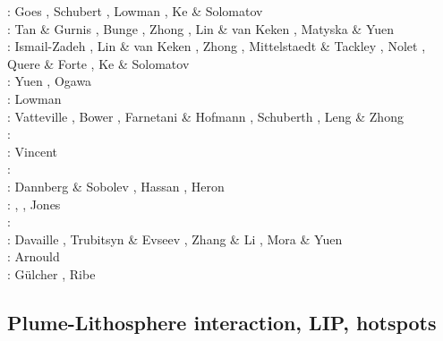 \begin{scriptsize}
\twothousandfour: Goes \etal \cite{goch04}, Schubert \etal \cite{scmo04}, Lowman \etal \cite{lokg04},
                  Ke \& Solomatov \cite{keso04} \\
\twothousandfive: Tan \& Gurnis \cite{tagu05}, Bunge \cite{bung05}, Zhong \cite{zhon05}, 
                  Lin \& van Keken \cite{liva05}, Matyska \& Yuen \cite{mayu05}\\
\twothousandsix: Ismail-Zadeh \etal \cite{isst06}, Lin \& van Keken \cite{liva06a,liva06b}, 
                 Zhong \cite{zhon06}, Mittelstaedt \& Tackley \cite{mita06},
                 Nolet \etal \cite{nokm06}, Quere \& Forte \cite{qufo06}, Ke \& Solomatov \cite{keso06}\\
\twothousandseven: Yuen \etal \cite{yumh07}, Ogawa \cite{ogaw07}\\
\twothousandeight: Lowman \etal \cite{logg08} \\
\twothousandnine: Vatteville \etal \cite{vavl09}, Bower \etal \cite{bogj09},
                  Farnetani \& Hofmann \cite{faho09}, Schuberth \etal \cite{scbs09b},
                  Leng \& Zhong \cite{lezh09}\\
\twothousandeleven: \cite{toyu11}\cite{talz11}\cite{burk11}\cite{memm11}\cite{dalt11}\cite{tree11}\\
\twothousandtwelve: Vincent \etal{} \cite{viym12}\\
\twothousandthirteen: \cite{dagm13}\cite{madd13}\cite{ande13}\cite{vadv13}\\
\twothousandfifteen: Dannberg \& Sobolev \cite{daso15}, Hassan \etal \cite{hafg15}, 
                     Heron \etal \cite{hels15}\\
\twothousandsixteen: \cite{kili16}, \cite{dannbergphd}, Jones \etal \cite{jodc16}\\
\twothousandseventeen: \cite{moyu17}\cite{lizh17}\\
\twothousandeighteen: Davaille \etal \cite{dacc18}, Trubitsyn \& Evseev \cite{trev18}, 
                      Zhang \& Li \cite{zhli18}, Mora \& Yuen \cite{moyu18}\\
\twothousandnineteen: Arnould \etal \cite{argc19}\\
\twothousandtwenty: G{\"u}lcher \etal \cite{gugm20}, Ribe \etal \cite{rits20}
\end{scriptsize}

\subsection{Plume-Lithosphere interaction, LIP, hotspots}

